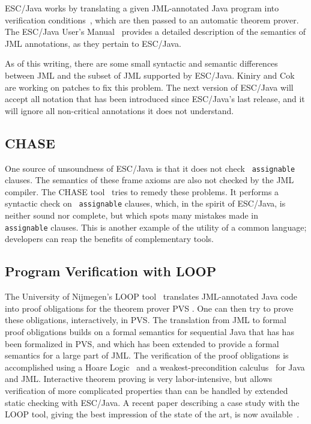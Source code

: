 \documentclass{entcs}
\begin{document}
ESC/Java works by translating a given JML-annotated Java program into
verification conditions~\cite{LeinoSaxeStata:JavaViaGC}, which are
then passed to an automatic theorem prover.  The ESC/Java User's
Manual~\cite{escjava:userman} provides a detailed description of the
semantics of JML annotations, as they pertain to ESC/Java.

As of this writing, there are some small syntactic and semantic
differences between JML and the subset of JML supported by ESC/Java.
Kiniry and Cok are working on patches to fix this problem.  The next
version of ESC/Java will accept all notation that has been introduced
since ESC/Java's last release, and it will ignore all non-critical
annotations it does not understand.

\subsection{CHASE}
\label{Chase}

One source of unsoundness of ESC/Java is that it does not check {\tt
  assignable} clauses.  The semantics of these frame axioms are also
not checked by the JML compiler.  The CHASE tool~\cite{CH03} tries to
remedy these problems.  It performs a syntactic check on {\tt
  assignable} clauses, which, in the spirit of ESC/Java, is neither
sound nor complete, but which spots many mistakes made in {\tt
  assignable} clauses.  This is another example of the utility of a
common language; developers can reap the benefits of complementary
tools.

\subsection{Program Verification with LOOP}
\label{loop}

The University of Nijmegen's LOOP tool~\cite{Jacobs-etal98,Huisman01}
translates JML-annotated Java code into proof obligations for the
theorem prover PVS \cite{OwreRRSS96}.  One can then try to prove these
obligations, interactively, in PVS\@.  The translation from JML to
formal proof obligations builds on a formal semantics for sequential
Java that has has been formalized in PVS, and which has been extended
to provide a formal semantics for a large part of JML\@.  The
verification of the proof obligations is accomplished using a Hoare
Logic~\cite{JacobsPoll01a} and a weakest-precondition
calculus~\cite{Jacobs03} for Java and JML\@.  Interactive theorem
proving is very labor-intensive, but allows verification of more
complicated properties than can be handled by extended static checking
with ESC/Java.  A recent paper describing a case study with the LOOP
tool, giving the best impression of the state of the art, is now
available~\cite{BreunesseBJ02}.
\end{document}
